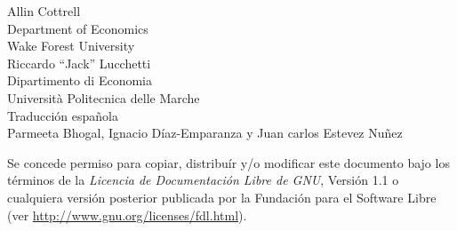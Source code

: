 \documentclass[oneside,spanish]{book}
\begin{document}
\VerbatimFootnotes

\setlength{\parindent}{0pt}
\setlength{\parskip}{1ex}



\thispagestyle{empty}

\begin{center}



{\large \sffamily
Allin Cottrell\\
Department of Economics\\
Wake Forest University\\

\vspace{20pt}
Riccardo ``Jack'' Lucchetti\\
Dipartimento di Economia\\
Università Politecnica delle Marche\\

\vspace{20pt}
Traducción española \\
Parmeeta Bhogal, Ignacio Díaz-Emparanza y Juan carlos Estevez Nuñez

\vspace{20pt}

}

\end{center}
\clearpage


\thispagestyle{empty}


\vspace*{2in}

Se concede permiso para copiar, distribuír y/o modificar este documento bajo
los términos de la \emph{Licencia de Documentación Libre de GNU}, Versión 1.1
o cualquiera versión posterior publicada por la Fundación para el Software Libre
(ver \url{http://www.gnu.org/licenses/fdl.html}).

\clearpage


\pagestyle{headings}

\tableofcontents

\clearpage








\clearpage

\end{document}
